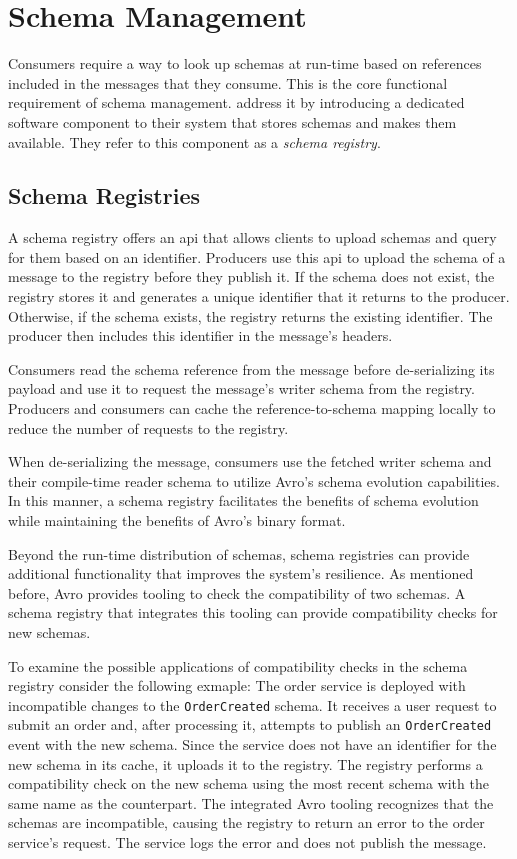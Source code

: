 
\section{Schema Management}\label{sec:schema-management}

Consumers require a way to look up schemas at run-time based on references included in the messages that they consume.
This is the core functional requirement of schema management.
\cite{kreps_kafka_2011} address it by introducing a dedicated software component to their system that stores schemas and makes them available.
They refer to this component as a \emph{schema registry}.

\subsection{Schema Registries}

A schema registry offers an \gls{api} that allows clients to upload schemas and query for them based on an identifier.
Producers use this \gls{api} to upload the schema of a message to the registry before they publish it.
If the schema does not exist, the registry stores it and generates a unique identifier that it returns to the producer.
Otherwise, if the schema exists, the registry returns the existing identifier.
The producer then includes this identifier in the message's headers.

Consumers read the schema reference from the message before de-serializing its payload and use it to request the message's writer schema from the registry.
Producers and consumers can cache the reference-to-schema mapping locally to reduce the number of requests to the registry.

When de-serializing the message, consumers use the fetched writer schema and their compile-time reader schema to utilize Avro's schema evolution capabilities.
In this manner, a schema registry facilitates the benefits of schema evolution while maintaining the benefits of Avro's binary format.

Beyond the run-time distribution of schemas, schema registries can provide additional functionality that improves the system's resilience.
As mentioned before, Avro provides tooling to check the compatibility of two schemas.
A schema registry that integrates this tooling can provide compatibility checks for new schemas.

To examine the possible applications of compatibility checks in the schema registry consider the following exmaple:
The order service is deployed with incompatible changes to the \texttt{OrderCreated} schema.
It receives a user request to submit an order and, after processing it, attempts to publish an \texttt{OrderCreated} event with the new schema.
Since the service does not have an identifier for the new schema in its cache, it uploads it to the registry.
The registry performs a compatibility check on the new schema using the most recent schema with the same name as the counterpart.
The integrated Avro tooling recognizes that the schemas are incompatible, causing the registry to return an error to the order service's request.
The service logs the error and does not publish the message.

